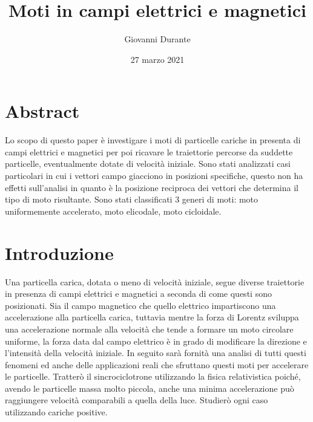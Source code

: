 \documentclass[dvips]{article}
\begin{document}
\title{Moti in campi elettrici e magnetici}
\author{Giovanni Durante}
\date{27 marzo 2021}

\begin{titlepage}
	\maketitle
\end{titlepage}

\tableofcontents
 
\section{Abstract}
Lo scopo di questo paper è investigare i moti di particelle cariche in presenta di campi elettrici e magnetici per poi ricavare le traiettorie percorse da suddette particelle, eventualmente dotate di velocità iniziale. Sono stati analizzati casi particolari in cui i vettori campo giacciono in posizioni specifiche, questo non ha effetti sull'analisi in quanto è la posizione reciproca dei vettori che determina il tipo di moto risultante. Sono stati classificati 3 generi di moti: moto uniformemente accelerato, moto elicodale, moto cicloidale. 

\section{Introduzione}
Una particella carica, dotata o meno di velocità iniziale, segue diverse traiettorie in presenza di campi elettrici e magnetici a seconda di come questi sono posizionati. Sia il campo magnetico che quello elettrico impartiscono una accelerazione alla particella carica, tuttavia mentre la forza di Lorentz sviluppa una accelerazione normale alla velocità che tende a formare un moto circolare uniforme, la forza data dal campo elettrico è in grado di modificare la direzione e l'intensità della velocità iniziale. In seguito sarà fornità una analisi di tutti questi fenomeni ed anche delle applicazioni reali che sfruttano questi moti per accelerare le particelle. Tratterò il sincrociclotrone utilizzando la fisica relativistica poiché, avendo le particelle massa molto piccola, anche una minima accelerazione può raggiungere velocità comparabili a quella della luce. Studierò ogni caso utilizzando cariche positive.
\end{document}
